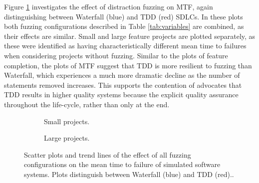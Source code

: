 \documentclass{llncs}
\begin{document}
Figure \ref{fig:fuzzing-mtf} investigates the effect of distraction fuzzing on MTF, again distinguishing between
Waterfall (blue) and TDD (red) SDLCs.  In these plots both fuzzing configurations described in Table \ref{tab:variables}
are combined, as their effects are similar.  Small and large feature projects are plotted separately, as these were
identified as having characteristically different mean time to failures when considering projects without fuzzing.
Similar to the plots of feature completion, the plots of MTF suggest that TDD is more resilient to fuzzing than
Waterfall, which experiences a much more dramatic decline as the number of statements removed increases.  This supports
the contention of advocates that TDD results in higher quality systems because the explicit quality assurance throughout
the life-cycle, rather than only at the end.


\begin{figure}[t]
  \centering
  \begin{subfigure}{2.3in}
    \caption{Small projects.}
  \end{subfigure}
  \hfill
  \begin{subfigure}{2.3in}
    \caption{Large projects.}  
  \end{subfigure}
  
  \caption{Scatter plots and trend lines of the effect of all fuzzing configurations on the mean time to failure of
    simulated software systems.  Plots distinguish between Waterfall (blue) and TDD (red)..}
  \label{fig:fuzzing-mtf}
\end{figure}
 
\end{document}
